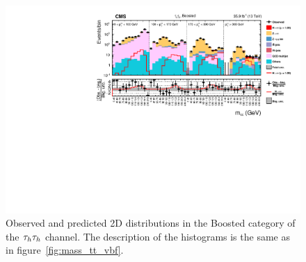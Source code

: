 %
%

\begin{figure}[htbp]
\centering
     \includegraphics[width=1.0\textwidth]{higgs_to_taus/plots/Figure_010.pdf}
     \caption{Observed and predicted 2D distributions in the Boosted category of the $\tau_{h}\tau_{h}$ channel. The description of the histograms is the same as in figure~\ref{fig:mass_tt_vbf}.}
     \label{fig:mass_tt_boosted}
\end{figure}

